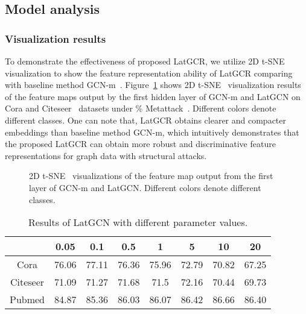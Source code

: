 \documentclass{article}
\begin{document}
\subsection{Model analysis}

\subsubsection{Visualization results}

To demonstrate the effectiveness of proposed LatGCR, we utilize 2D t-SNE~\cite{tsne} visualization to show the feature representation ability of LatGCR comparing with baseline method GCN-m~\cite{graphsage,kipf2016semi}.
Figure~\ref{fig:demo} shows 2D t-SNE~\cite{tsne} visualization results of the feature maps output by the first hidden layer of GCN-m and LatGCN on Cora and  Citeseer~\cite{sen2008collective,prognn} datasets under \% Metattack~\cite{mettack}. Different colors denote different classes.
One can note that, LatGCR obtains clearer and compacter embeddings than baseline method GCN-m, which intuitively demonstrates that the proposed LatGCR can obtain more robust and discriminative feature representations for graph data with structural attacks.

\begin{figure}[htpb]
\centering
{}
\caption{2D t-SNE~\cite{tsne} visualizations of the feature map output from the first layer of GCN-m and LatGCN. Different colors denote different classes.}
\label{fig:demo}
\end{figure}
\begin{table}[!htpb]
\centering
\caption{\upshape Results of LatGCN with different parameter  values.}
\label{tab:lambda}
\renewcommand\arraystretch{1.3}
\begin{tabular}{c|ccccccc}
  \hline
  \hline
    & 0.05 & 0.1& 0.5 & 1   &5    &   10&20\\
  \hline
   Cora      &76.06&77.11&76.36&75.96&72.79&70.82&67.25 \\
   Citeseer  &71.09&71.27&71.68&71.5&72.16&70.44&69.73\\
   Pubmed    &84.87&85.36&86.03&86.07&86.42&86.66&86.40 \\
  \hline
  \hline
\end{tabular}
\end{table}
\end{document}
